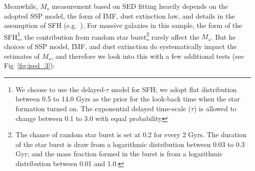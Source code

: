 \documentclass[a4paper,fleqn,usenatbib]{mnras}
\def\mstar{{$M_{\star}$}}
\begin{document}
    Meanwhile, \mstar{} measurement based on SED fitting heavily depends on the 
    adopted SSP model, the form of IMF, dust extinction law, and details in 
    the assumption of SFH (e.g.\ \citealt{Bernardi2016b}). 
    For massive galaxies in this sample, the form of the SFH\footnote{We choose 
    to use the delayed-$\tau$ model for SFH; we adopt flat distribution between 
    0.5 to 14.0 Gyrs as the prior for the look-back time when the star formation 
    turned on. 
    The exponential delayed time-scale ($\tau$) is allowed to change between 
    0.1 to 3.0 with equal probability}, the contribution from random star 
    burst\footnote{The chance of random star burst is set at 0.2 for every 2 Gyrs. 
    The duration of the star burst is draw from a logarithmic distribution 
    between 0.03 to 0.3 Gyr; and the mass fraction formed in the burst is from 
    a logarithmic distribution between 0.01 and 1.0.} rarely affect the \mstar{}. 
    But he choices of SSP model, IMF, and dust extinction do systematically impact
    the estimates of \mstar{}, and therefore we look into this with a few 
    additional tests (see Fig~\ref{fig:ised_3}):
\end{document}
